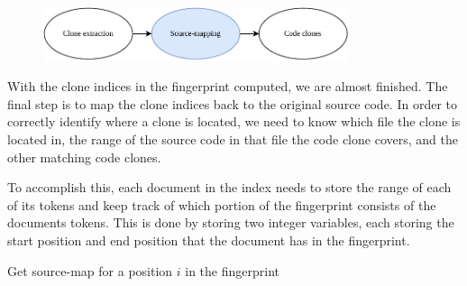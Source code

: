\begin{figure}[H]
    \begin{center}
        \includegraphics[width=0.8\textwidth]{figures/phases/phases_sourcemap.drawio.pdf}
    \end{center}
\end{figure}

With the clone indices in the fingerprint computed, we are almost finished. The final step
is to map the clone indices back to the original source code. In order to correctly
identify where a clone is located, we need to know which file the clone is located in, the
range of the source code in that file the code clone covers, and the other matching code
clones.

To accomplish this, each document in the index needs to store the range of each of its
tokens and keep track of which portion of the fingerprint consists of the documents
tokens. This is done by storing two integer variables, each storing the start position and
end position that the document has in the fingerprint. 

\begin{algorithm}[t]
  \SetAlgoLined\DontPrintSemicolon

  \vspace{0.5cm}
  \caption{Get source-map for a position $i$ in the fingerprint}
  \label{alg:sourcemap}
\end{algorithm}

